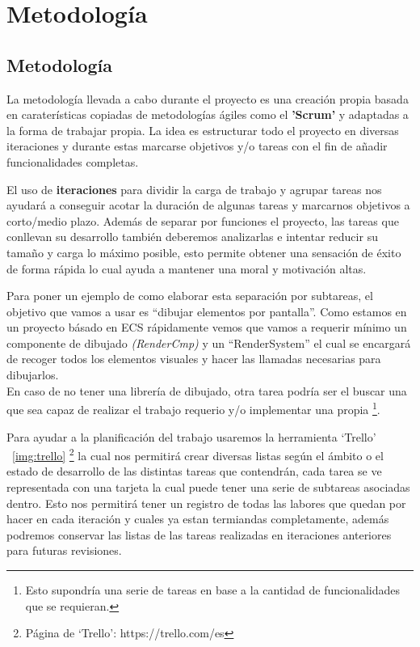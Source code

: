 \chapter{Metodología}
\label{metodologia}
\section{Metodología}
La metodología llevada a cabo durante el proyecto es una creación propia basada en caraterísticas
copiadas de metodologías ágiles como el \textbf{'Scrum'} y adaptadas a la forma de trabajar propia.
La idea es estructurar todo el proyecto en diversas iteraciones y durante estas marcarse
objetivos y/o tareas con el fin de añadir funcionalidades completas.

El uso de \textbf{iteraciones} para dividir la carga de trabajo y agrupar tareas nos ayudará
a conseguir acotar la duración de algunas tareas y marcarnos objetivos a corto/medio
plazo. Además de separar por funciones el proyecto, las tareas que conllevan su desarrollo
también deberemos analizarlas e intentar reducir su tamaño y carga lo máximo posible, esto
permite obtener una sensación de éxito de forma rápida lo cual ayuda a mantener una moral y 
motivación altas.

Para poner un ejemplo de como elaborar esta separación por subtareas, el objetivo que vamos a
usar es ``dibujar elementos por pantalla''. Como estamos en un proyecto básado en \ac{ECS} rápidamente
vemos que vamos a requerir mínimo un componente de dibujado \textit{(RenderCmp)} y un 
``RenderSystem'' el cual se encargará de recoger todos los elementos visuales y hacer las
llamadas necesarias para dibujarlos. \\
En caso de no tener una librería de dibujado, otra tarea podría ser el buscar una que sea capaz
de realizar el trabajo requerio y/o implementar una propia
\footnote{Esto supondría una serie de tareas en base a la cantidad de funcionalidades que se requieran.}. 

Para ayudar a la planificación del trabajo usaremos la herramienta `Trello'
~\ref{img:trello} \footnote{Página de `Trello': https://trello.com/es}
la cual nos permitirá crear diversas listas según el ámbito o el estado de
desarrollo de las distintas tareas que contendrán, cada tarea se ve representada con
una tarjeta la cual puede tener una serie de subtareas asociadas dentro. Esto nos
permitirá tener un registro de todas las labores que quedan por hacer en cada iteración y
cuales ya estan termiandas completamente, además podremos conservar las listas de las tareas
realizadas en iteraciones anteriores para futuras revisiones.

